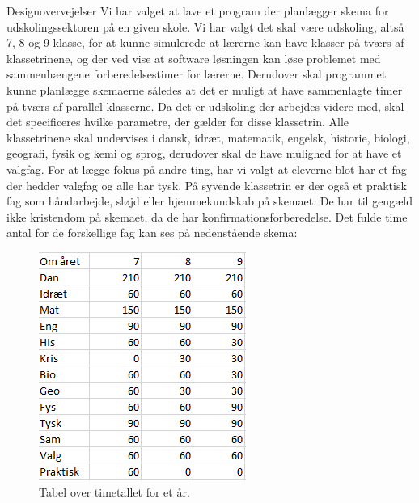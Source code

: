 Designovervejelser
Vi har valget at lave et program der planlægger skema for udskolingssektoren på en given skole. Vi har valgt det skal være udskoling, altså 7, 8 og 9 klasse, for at kunne simulerede at lærerne kan have klasser på tværs af klassetrinene, og der ved vise at software løsningen kan løse problemet med sammenhængene forberedelsestimer for lærerne. Derudover skal programmet kunne planlægge skemaerne således at det er muligt at have sammenlagte timer på tværs af parallel klasserne.  Da det er udskoling der arbejdes videre med, skal det specificeres hvilke parametre, der gælder for disse klassetrin. Alle klassetrinene skal undervises i dansk, idræt, matematik, engelsk, historie, biologi, geografi, fysik og kemi og sprog, derudover skal de have mulighed for at have et valgfag. For at lægge fokus på andre ting, har vi valgt at eleverne blot har et fag der hedder valgfag og alle har tysk. På syvende klassetrin er der også et praktisk fag som håndarbejde, sløjd eller hjemmekundskab på skemaet. De har til gengæld ikke kristendom på skemaet, da de har konfirmationsforberedelse. Det fulde time antal for de forskellige fag kan ses på nedenstående skema:
\begin{figure}[!h]
  \centering
  \includegraphics[width=\textwidth]{partials/graphics/antalaftimerpaaetaar.png}
  \caption{Tabel over timetallet for et år.}
  \label{fig:Timetalaar}
\end{figure}

